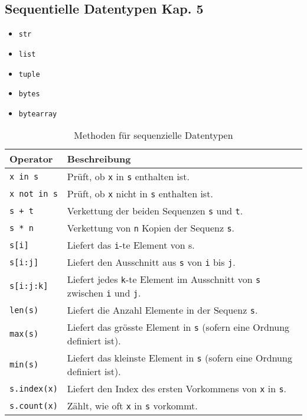 \subsection[Sequentielle Datentypen]{Sequentielle Datentypen \tiny{Kap. 5}}
\begin{itemize}
	\item \texttt{str}
	\item \texttt{list}
	\item \texttt{tuple}
	\item \texttt{bytes}
	\item \texttt{bytearray}
\end{itemize}
\begin{table}[H]
\begin{threeparttable}
\caption{Methoden für sequenzielle Datentypen}
\begin{tabular}{|l|l|}
	\hline 
	\textbf{Operator} &\textbf{Beschreibung}\\ 
	\hline 
	\texttt{x in s} &Prüft, ob \texttt{x} in \texttt{s} enthalten ist.\\ 
	\texttt{x not in s} &Prüft, ob \texttt{x} nicht in \texttt{s} enthalten ist.\\
	\texttt{s + t} &Verkettung der beiden Sequenzen \texttt{s} und \texttt{t}.\\ 
	\texttt{s * n} &Verkettung von \texttt{n} Kopien der Sequenz \texttt{s}.\\ 
	\texttt{s[i]} &Liefert das \texttt{i}-te Element von s.\\ 
	\texttt{s[i:j]} &Liefert den Ausschnitt aus \texttt{s} von \texttt{i} bis \texttt{j}.\\
	\texttt{s[i:j:k]} &Liefert jedes \texttt{k}-te Element im Ausschnitt von \texttt{s} zwischen \texttt{i} und \texttt{j}.\\
	\texttt{len(s)} &Liefert die Anzahl Elemente in der Sequenz \texttt{s}.\\
	\texttt{max(s)} &Liefert das grösste Element in \texttt{s} (sofern eine Ordnung definiert ist).\\
	\texttt{min(s)} &Liefert das kleinste Element in \texttt{s} (sofern eine Ordnung definiert ist).\\
	\texttt{s.index(x)} &Liefert den Index des ersten Vorkommens von \texttt{x} in \texttt{s}.\\
	\texttt{s.count(x)} &Zählt, wie oft \texttt{x} in \texttt{s} vorkommt.\\
	\hline 
\end{tabular}
\end{threeparttable}
\end{table}

